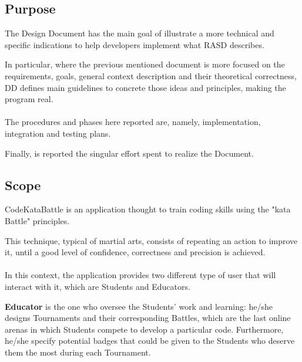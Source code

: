 \subsection{Purpose}
The Design Document has the main goal of illustrate a more technical and specific indications to help developers implement what RASD describes.

In particular, where the previous mentioned document is more focused on the requirements, goals, general context description and their theoretical correctness, DD defines main guidelines to concrete those ideas and principles, 
making the program real.\\
\\
The procedures and phases here reported are, namely, implementation, integration and testing plans.

Finally, is reported the singular effort spent to realize the Document.

\subsection{Scope}
CodeKataBattle is an application thought to train coding skills using the "kata Battle" principles. 

This technique, typical of martial arts, consists of repeating an action to improve it, until a good level of confidence, correctness and precision is achieved.\\
\\
In this context, the application provides two different type of user that will interact with it, which are Students and Educators.

\textbf{Educator} is the one who oversee the Students' work and learning: he/she designs Tournaments and their corresponding Battles, which are the last online arenas in which Students compete to develop a particular code. Furthermore, 
he/she specify potential badges that could be given to the Students who deserve them the most during each Tournament.

